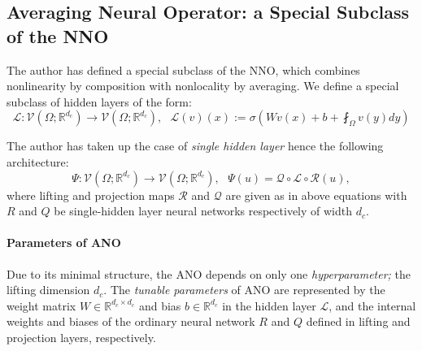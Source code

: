 \documentclass[reqno,9pt]{amsart}
\theoremstyle{plain}
\theoremstyle{definition}
\newcommand{\bb}[1]{\mathbb{#1}}
\newcommand{\cal}[1]{\mathcal{#1}}
\begin{document}
\subsection{\bf Averaging Neural Operator: a Special Subclass of the NNO}
The author has defined a special subclass of the NNO, which combines nonlinearity by composition with nonlocality by averaging. We define a special subclass of hidden layers of the form:
\begin{equation}\label{1}
    \cal L : \cal V(\Omega;\bb R^{d_c}) \to \cal V(\Omega;\bb R^{d_c}),~~~ \cal L(v)(x) := \sigma\left(Wv(x) + b+ \fint_\Omega v(y) dy \right)
\end{equation}

\noindent The author has taken up the case of {\it single hidden layer} hence the following architecture:
$$ \Psi:\cal V(\Omega;\bb R^{d_c}) \to \cal V(\Omega;\bb R^{d_c}),~~~ \Psi(u) = \cal Q \circ \cal L \circ \cal R(u),$$
where lifting and projection maps $\cal R$ and $\cal Q$ are given as in above equations with $R$ and $Q$ be single-hidden layer neural networks respectively of width $d_c$. 
\paragraph{\bf Parameters of ANO} Due to its minimal structure, the ANO depends on only one {\it hyperparameter;} the lifting dimension $d_c$. The {\it tunable parameters} of ANO are represented by the weight matrix $W \in \bb R^{d_c\times d_c}$ and bias $b \in \bb R^{d_c}$ in the hidden layer $\cal L$, and the internal weights and biases of the ordinary neural network $R$ and $Q$ defined in lifting and projection layers, respectively.
\end{document}
